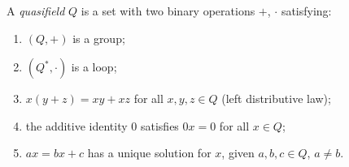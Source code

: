 A \emph{quasifield} $Q$ is a set with two binary operations $+$, $\cdot$ satisfying:
\begin{enumerate}
\item $(Q, +)$ is a group;
\item $(Q^*, \cdot)$ is a loop;
\item $x(y+z) = xy + xz$ for all $x, y, z \in Q$ (left distributive law);
\item the additive identity $0$ satisfies $0x = 0$ for all $x \in Q$;
\item $ax = bx + c$ has a unique solution for $x$, given $a, b, c \in Q$, $a \neq b$.
\end{enumerate}
